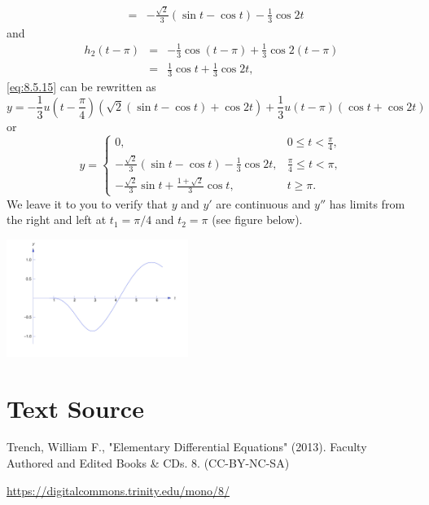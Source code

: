 \documentclass{ximera}
\begin{document}
\begin{example}
\begin{explanation}
\begin{eqnarray*}
&=&-\frac{\sqrt{2}}{3} (\sin t-\cos t)-\frac{1}{3}\cos2t
\end{eqnarray*}
and
\begin{eqnarray*}
h_2(t-\pi)&=&-\frac{1}{3}\cos (t-\pi)+\frac{1}{3}\cos2(t-\pi)\\
&=&\frac{1}{3}\cos t+\frac{1}{3}\cos2t,
\end{eqnarray*}
 \eqref{eq:8.5.15} can be rewritten as
$$
y=-\frac{1}{3}u\left(t-\frac{\pi}{4}\right)\left(\sqrt{2}(\sin
t-\cos t)+\cos2t\right)
+ \frac{1}{3} u(t-\pi) (\cos t+\cos2t)
$$
or
\begin{equation}\label{eq:8.5.16}
y=\left\{\begin{array}{cl}
0,&0\leq t<\frac{\pi}{4},\\
-\frac{\sqrt{2}}{3}(\sin t-\cos t)-\frac{1}{3}\cos2t,&\frac{\pi}{4}\leq t<\pi,\\
-\frac{\sqrt{2}}{3}\sin t+\frac{1+\sqrt{2}}{3}\cos t ,&t\geq\pi.
\end{array}\right.
\end{equation}
We leave it to you to verify that $y$ and $y'$ are continuous and
$y''$ has limits from the right and left at $t_1=\pi/4$ and $t_2=\pi$
(see figure below).

\begin{image}
 \includegraphics[height=1.5in]{fig080502.jpg}
\end{image}

\end{explanation}
\end{example}

\section*{Text Source}
Trench, William F., "Elementary Differential Equations" (2013). Faculty Authored and Edited Books \& CDs. 8. (CC-BY-NC-SA)

\href{https://digitalcommons.trinity.edu/mono/8/}{https://digitalcommons.trinity.edu/mono/8/}
\end{document}
